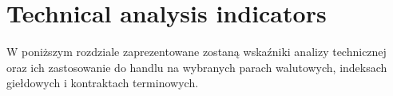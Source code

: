 

\chapter{Technical analysis indicators}
\label{Indicators} %

W poniższym rozdziale zaprezentowane zostaną wskaźniki analizy technicznej oraz ich zastosowanie do handlu na wybranych parach walutowych, indeksach giełdowych i kontraktach terminowych.









